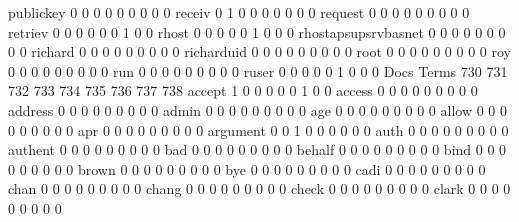 \documentclass[compress,8pt]{beamer}
\begin{document}
\begin{frame}
\begin{Schunk}
  publickey                                  0   0   0   0   0   0   0   0   0
  receiv                                     0   1   0   0   0   0   0   0   0
  request                                    0   0   0   0   0   0   0   0   0
  retriev                                    0   0   0   0   0   0   1   0   0
  rhost                                      0   0   0   0   0   1   0   0   0
  rhostapsupsrvbasnet                        0   0   0   0   0   0   0   0   0
  richard                                    0   0   0   0   0   0   0   0   0
  richarduid                                 0   0   0   0   0   0   0   0   0
  root                                       0   0   0   0   0   0   0   0   0
  roy                                        0   0   0   0   0   0   0   0   0
  run                                        0   0   0   0   0   0   0   0   0
  ruser                                      0   0   0   0   0   1   0   0   0
                                          Docs
Terms                                      730 731 732 733 734 735 736 737 738
  accept                                     1   0   0   0   0   0   1   0   0
  access                                     0   0   0   0   0   0   0   0   0
  address                                    0   0   0   0   0   0   0   0   0
  admin                                      0   0   0   0   0   0   0   0   0
  age                                        0   0   0   0   0   0   0   0   0
  allow                                      0   0   0   0   0   0   0   0   0
  apr                                        0   0   0   0   0   0   0   0   0
  argument                                   0   0   1   0   0   0   0   0   0
  auth                                       0   0   0   0   0   0   0   0   0
  authent                                    0   0   0   0   0   0   0   0   0
  bad                                        0   0   0   0   0   0   0   0   0
  behalf                                     0   0   0   0   0   0   0   0   0
  bind                                       0   0   0   0   0   0   0   0   0
  brown                                      0   0   0   0   0   0   0   0   0
  bye                                        0   0   0   0   0   0   0   0   0
  cadi                                       0   0   0   0   0   0   0   0   0
  chan                                       0   0   0   0   0   0   0   0   0
  chang                                      0   0   0   0   0   0   0   0   0
  check                                      0   0   0   0   0   0   0   0   0
  clark                                      0   0   0   0   0   0   0   0   0

\end{Schunk}
\end{frame}
\end{document}
